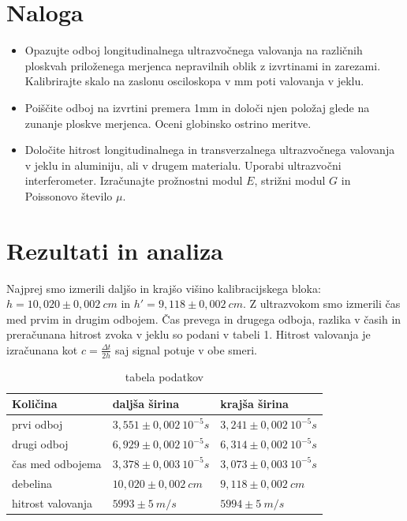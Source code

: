 \documentclass[12pt]{article}
\begin{document}
\section{Naloga}

\begin{itemize}
    \item Opazujte odboj longitudinalnega ultrazvočnega valovanja na različnih ploskvah priloženega merjenca nepravilnih oblik z izvrtinami in zarezami. Kalibrirajte skalo na zaslonu osciloskopa v mm poti valovanja v jeklu.
    \item Poiščite odboj na izvrtini premera 1mm in določi njen položaj glede na zunanje ploskve merjenca. Oceni globinsko ostrino meritve.
    \item Določite hitrost longitudinalnega in transverzalnega ultrazvočnega valovanja v jeklu in aluminiju, ali v drugem materialu. Uporabi ultrazvočni interferometer. Izračunajte prožnostni modul $E$, strižni modul $G$ in Poissonovo število $\mu$.
\end{itemize}

\section{Rezultati in analiza}

Najprej smo izmerili daljšo in krajšo višino kalibracijskega bloka: $h = 10,020 \pm 0,002\ cm$ in $h' = 9,118\pm 0,002\ cm$. Z ultrazvokom smo izmerili čas med prvim in drugim odbojem. Čas prevega in drugega odboja, razlika v časih in preračunana hitrost zvoka v jeklu so podani v tabeli 1. Hitrost valovanja je izračunana kot $c = \frac{\Delta t}{2h}$ saj signal potuje v obe smeri.
\begin{table}[h]
\begin{center}

\begin{tabular}{l|l|l}
Količina          & daljša širina              & krajša širina              \\ \hline
prvi odboj        & $3,551\pm 0,002\ 10^{-5}s$ & $3,241\pm 0,002\ 10^{-5}s$ \\
drugi odboj       & $6,929\pm 0,002\ 10^{-5}s$ & $6,314\pm 0,002\ 10^{-5}s$ \\
čas med odbojema  & $3,378\pm 0,003\ 10^{-5}s$ & $3,073\pm 0,003\ 10^{-5}s$ \\
debelina          & $10,020\pm 0,002\ cm$      & $9,118\pm 0,002\ cm$       \\
hitrost valovanja & $5993\pm 5\ m/s$           & $5994\pm 5\ m/s$          


\end{tabular}
\label{blok-tabela}
\caption{tabela podatkov}
\end{center}
\end{table}
\end{document}
